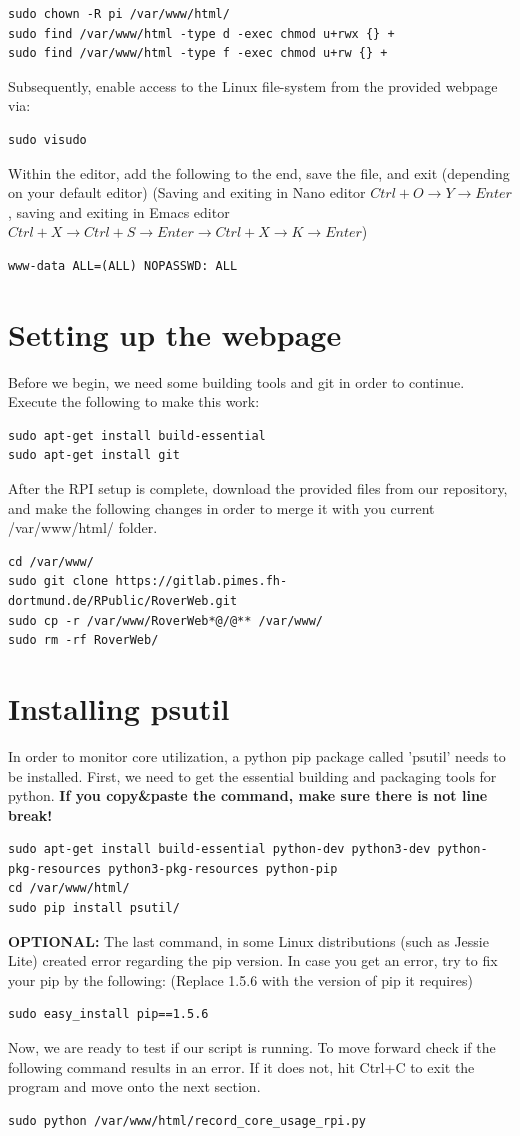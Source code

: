 \begin{lstlisting}
sudo chown -R pi /var/www/html/
sudo find /var/www/html -type d -exec chmod u+rwx {} +
sudo find /var/www/html -type f -exec chmod u+rw {} +
\end{lstlisting}
Subsequently, enable access to the Linux file-system from the provided webpage via:
\begin{lstlisting}
sudo visudo
\end{lstlisting}
Within the editor, add the following to the end, save the file, and exit (depending on your default editor)
(Saving and exiting in Nano editor $Ctrl+O \rightarrow Y \rightarrow Enter$, saving and exiting in Emacs editor $Ctrl + X \rightarrow Ctrl + S \rightarrow Enter \rightarrow Ctrl + X \rightarrow K \rightarrow Enter$) 
\begin{lstlisting}
www-data ALL=(ALL) NOPASSWD: ALL
\end{lstlisting}
\section{Setting up the webpage}
Before we begin, we need some building tools and git in order to continue. Execute the following to make this work:
\begin{lstlisting}
sudo apt-get install build-essential
sudo apt-get install git
\end{lstlisting}
After the RPI setup is complete, download the provided files from our repository, and make the following changes in order to merge it with you current /var/www/html/ folder. 
\begin{lstlisting}
cd /var/www/
sudo git clone https://gitlab.pimes.fh-dortmund.de/RPublic/RoverWeb.git
sudo cp -r /var/www/RoverWeb*@/@** /var/www/
sudo rm -rf RoverWeb/
\end{lstlisting}
\section{Installing psutil}
In order to monitor core utilization, a python pip package called 'psutil' needs to be installed. First, we need to get the essential building and packaging tools for python. \textbf{If you copy\&paste the command, make sure there is not line break!}
\begin{lstlisting}
sudo apt-get install build-essential python-dev python3-dev python-pkg-resources python3-pkg-resources python-pip
cd /var/www/html/
sudo pip install psutil/
\end{lstlisting}
\textbf{OPTIONAL:} The last command, in some Linux distributions (such as Jessie Lite) created error regarding the pip version. In case you get an error, try to fix your pip by the following: (Replace 1.5.6 with the version of pip it requires) 
\begin{lstlisting}
sudo easy_install pip==1.5.6
\end{lstlisting}
Now, we are ready to test if our script is running. To move forward check if the following command results in an error. If it does not, hit Ctrl+C to exit the program and move onto the next section.
\begin{lstlisting}
sudo python /var/www/html/record_core_usage_rpi.py
\end{lstlisting}
